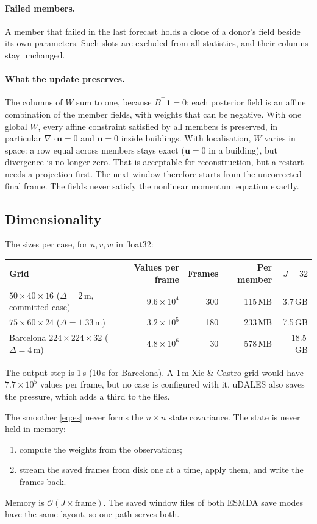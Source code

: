 \documentclass[11pt,a4paper]{article}
\newcommand{\T}{^{\top}}
\begin{document}
\paragraph{Failed members.} A member that failed in the last forecast holds a
clone of a donor's field beside its own parameters. Such slots are excluded
from all statistics, and their columns stay unchanged.

\paragraph{What the update preserves.} The columns of $W$ sum to one, because
$B\T\bm 1 = 0$: each posterior field is an affine combination of the member
fields, with weights that can be negative. With one global $W$, every affine
constraint satisfied by all members is preserved, in particular
$\nabla\cdot\bm u = 0$ and $\bm u = 0$ inside buildings. With localisation, $W$
varies in space: a row equal across members stays exact ($\bm u = 0$ in a
building), but divergence is no longer zero. That is acceptable for
reconstruction, but a restart needs a projection first. The next window
therefore starts from the uncorrected final frame. The fields never satisfy the
nonlinear momentum equation exactly.

\subsection{Dimensionality}
\label{sec:sizes}
The sizes per case, for $u, v, w$ in float32:
\begin{center}
\begin{tabular}{@{}lrrrr@{}}
\toprule
Grid & Values per frame & Frames & Per member & $J = 32$ \\
\midrule
$50\times40\times16$ ($\Delta = 2$\,m, committed case) & $9.6\times10^4$ & 300 & 115\,MB & 3.7\,GB \\
$75\times60\times24$ ($\Delta = 1.33$\,m) & $3.2\times10^5$ & 180 & 233\,MB & 7.5\,GB \\
Barcelona $224\times224\times32$ ($\Delta = 4$\,m) & $4.8\times10^6$ & 30 & 578\,MB & 18.5\,GB \\
\bottomrule
\end{tabular}
\end{center}
The output step is 1\,s (10\,s for Barcelona). A 1\,m Xie \& Castro grid would
have $7.7\times10^5$ values per frame, but no case is configured with it. uDALES
also saves the pressure, which adds a third to the files.

The smoother \eqref{eq:es} never forms the $n\times n$ state covariance. The
state is never held in memory:
\begin{enumerate}
\item compute the weights from the observations;
\item stream the saved frames from disk one at a time, apply them, and write
  the frames back.
\end{enumerate}
Memory is $\mathcal O(J \times \text{frame})$. The saved window files of both
ESMDA save modes have the same layout, so one path serves both.
\end{document}
